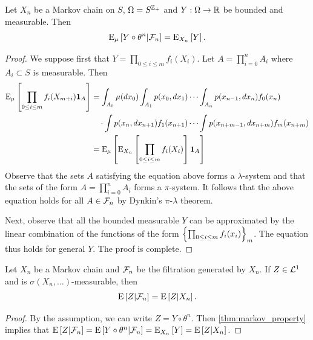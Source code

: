 \begin{theorem}\label{thm:markov_property}
    Let $X_n$ be a Markov chain on $S$, $\Omega = S^{\mathbb{Z}_+}$ and $Y:\Omega\to\mathbb{R}$ be bounded 
    and measurable. Then 
    \begin{equation*}
        \operatorname{E}_\mu\left[ {Y\circ\theta^n|\mathcal{F}_n} \right] = \operatorname{E}_{X_n}\left[ {Y} \right]. 
    \end{equation*}  
\end{theorem}
\begin{proof}
    We suppose first that $Y = \prod_{0\leq i\leq m}f_i(X_i)$. Let $A = \prod_{i=0}^nA_i$ 
    where $A_i\subset S$ is measurable. Then 
    \begin{equation*}
        \begin{split}
            \operatorname{E}_{\mu}\left[ {\prod_{0\leq i\leq m}f_i(X_{m+i})\mathbf{1}_A} \right] 
            &= \int_{A_0}\mu(dx_0)\int_{A_1} p(x_0,dx_1) \cdots\int_{A_n}p(x_{n-1},dx_n)f_0(x_n) \\
            &\quad \cdot\int p(x_n,dx_{n+1})f_1(x_{n+1})\cdots\int p(x_{n+m-1},dx_{n+m})f_m(x_{n+m}) \\ 
            &= \operatorname{E}_\mu\left[ {\operatorname{E}_{X_n}\left[ {\prod_{0\leq i\leq m}f_i(X_{i})} \right]\mathbf{1}_A} \right]
        \end{split}
    \end{equation*}
    Observe that the sets $A$ satisfying the equation above forms a $\lambda$-system 
    and that the sets of the form $A = \prod_{i=0}^nA_i$ forms a $\pi$-system. It follows 
    that the above equation holds for all $A\in\mathcal{F}_n$ by Dynkin's $\pi$-$\lambda$ 
    theorem. 

    Next, observe that all the bounded measurable $Y$ can be approximated by the 
    linear combination of the functions of the form $\left\{ {\prod_{0\leq i\leq m}f_i(x_i)} \right\}_m$. 
    The equation thus holds for general $Y$. The proof is complete. 
\end{proof}

\begin{corollary}
    Let $X_n$ be a Markov chain and $\mathcal{F}_n$ be the filtration generated by $X_n$. 
    If $Z\in\mathcal{L}^1$ and is $\sigma(X_n,\ldots)$-measurable, then 
    \begin{equation*}
        \operatorname{E}\left[ {Z|\mathcal{F}_n} \right] = \operatorname{E}\left[ {Z|X_n} \right]. 
    \end{equation*} 
\end{corollary}
\begin{proof}
    By the assumption, we can write $Z = Y\circ\theta^n$. Then \cref{thm:markov_property} 
    implies that $\operatorname{E}\left[ {Z|\mathcal{F}_n} \right] = \operatorname{E}\left[ {Y\circ \theta^n|\mathcal{F}_n} \right] = \operatorname{E}_{X_n}\left[ {Y} \right] = \operatorname{E}\left[ {Z|X_n} \right]$. 
\end{proof}

